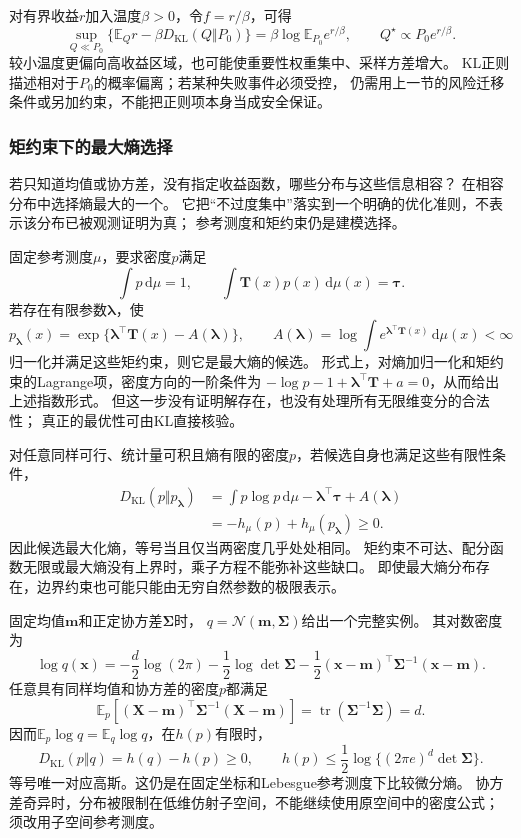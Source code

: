 对有界收益\(r\)加入温度\(\beta>0\)，令\(f=r/\beta\)，可得
\[
  \sup_{Q\ll P_0}\{\mathbb E_Qr-\beta D_{\mathrm{KL}}(Q\Vert P_0)\}
  =\beta\log\mathbb E_{P_0}e^{r/\beta},\qquad
  Q^\star\propto P_0e^{r/\beta}.
\]
较小温度更偏向高收益区域，也可能使重要性权重集中、采样方差增大。
KL正则描述相对于\(P_0\)的概率偏离；若某种失败事件必须受控，
仍需用上一节的风险迁移条件或另加约束，不能把正则项本身当成安全保证。

\subsubsection{矩约束下的最大熵选择}
\label{sec:information-maximum-entropy}

若只知道均值或协方差，没有指定收益函数，哪些分布与这些信息相容？
在相容分布中选择熵最大的一个。
它把“不过度集中”落实到一个明确的优化准则，不表示该分布已被观测证明为真；
参考测度和矩约束仍是建模选择。

固定参考测度\(\mu\)，要求密度\(p\)满足
\[
  \int p\,\mathrm d\mu=1,\qquad
  \int \bm T(x)p(x)\,\mathrm d\mu(x)=\bm\tau.
\]
若存在有限参数\(\bm\lambda\)，使
\[
  p_{\bm\lambda}(x)
  =\exp\{\bm\lambda^\top\bm T(x)-A(\bm\lambda)\},\qquad
  A(\bm\lambda)=\log\int e^{\bm\lambda^\top\bm T(x)}\,\mathrm d\mu(x)<\infty
\]
归一化并满足这些矩约束，则它是最大熵的候选。
形式上，对熵加归一化和矩约束的Lagrange项，密度方向的一阶条件为
\(-\log p-1+\bm\lambda^\top\bm T+a=0\)，从而给出上述指数形式。
但这一步没有证明解存在，也没有处理所有无限维变分的合法性；
真正的最优性可由KL直接核验。

对任意同样可行、统计量可积且熵有限的密度\(p\)，若候选自身也满足这些有限性条件，
\[
\begin{aligned}
  D_{\mathrm{KL}}(p\Vert p_{\bm\lambda})
  &=\int p\log p\,\mathrm d\mu-\bm\lambda^\top\bm\tau+A(\bm\lambda)\\
  &=-h_\mu(p)+h_\mu(p_{\bm\lambda})\geq0.
\end{aligned}
\]
因此候选最大化熵，等号当且仅当两密度几乎处处相同。
矩约束不可达、配分函数无限或最大熵没有上界时，乘子方程不能弥补这些缺口。
即使最大熵分布存在，边界约束也可能只能由无穷自然参数的极限表示。

固定均值\(\bm m\)和正定协方差\(\bm\Sigma\)时，
\(q=\mathcal N(\bm m,\bm\Sigma)\)给出一个完整实例。
其对数密度为
\[
  \log q(\bm x)
  =-\frac d2\log(2\pi)-\frac12\log\det\bm\Sigma
   -\frac12(\bm x-\bm m)^\top\bm\Sigma^{-1}(\bm x-\bm m).
\]
任意具有同样均值和协方差的密度\(p\)都满足
\[
  \mathbb E_p[(\bm X-\bm m)^\top\bm\Sigma^{-1}(\bm X-\bm m)]
  =\operatorname{tr}(\bm\Sigma^{-1}\bm\Sigma)=d.
\]
因而\(\mathbb E_p\log q=\mathbb E_q\log q\)，在\(h(p)\)有限时，
\[
  D_{\mathrm{KL}}(p\Vert q)=h(q)-h(p)\geq0,\qquad
  h(p)\leq\frac12\log\{(2\pi e)^d\det\bm\Sigma\}.
\]
等号唯一对应高斯。这仍是在固定坐标和Lebesgue参考测度下比较微分熵。
协方差奇异时，分布被限制在低维仿射子空间，不能继续使用原空间中的密度公式；
须改用子空间参考测度。

